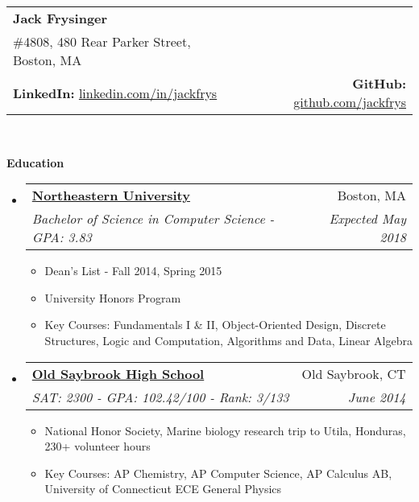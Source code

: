 \documentclass[letterpaper,10pt]{article}
\makeatletter
\newcommand{\resitem}[1]{\item #1 \vspace{-2pt}}
\newcommand{\resheading}[1]{{\large \colorbox{mygrey}{\begin{minipage}{\textwidth}{\textbf{#1 \vphantom{p\^{E}}}}\end{minipage}}}}
\newcommand{\ressubheading}[4]{
\begin{tabular*}{6.8in}{l@{\extracolsep{\fill}}r}
		\textbf{#1} & #2 \\
		\emph{#3} & \emph{#4} \\
\end{tabular*}\vspace{-6pt}}
\makeatother
\begin{document}
\newcommand{\mywebheader}{
\begin{tabular*}{7in}{l@{\extracolsep{\fill}}r}
	\textbf{\LARGE Jack Frysinger}
	\\
	\#4808, 480 Rear Parker Street, Boston, MA
	\\
	\textbf{LinkedIn:} \href{http://linkedin.com/in/jackfrys}{linkedin.com/in/jackfrys} & \textbf{GitHub:} \href{https://github.com/jackfrys}{github.com/jackfrys} \\
	\end{tabular*}
\\
\vspace{0.1in}}

\mywebheader

\resheading{Education}
	\begin{itemize}[leftmargin=*]
		\item[]
			\ressubheading{\href{http://www.northeastern.edu}{Northeastern University}}{Boston, MA}{{Bachelor of Science in Computer Science - }{GPA: 3.83}}{Expected May 2018}
				{ \footnotesize
				\begin{itemize}
					\resitem{Dean's List - Fall 2014, Spring 2015}
					\resitem{University Honors Program}
					\resitem{Key Courses: Fundamentals I \& II, Object-Oriented Design, Discrete Structures, Logic and Computation, Algorithms and Data, Linear Algebra}
				\end{itemize}}
		\item[]
			\ressubheading{\href{http://www.oldsaybrookschools.org/page.cfm?p=605}{Old Saybrook High School}}{Old Saybrook, CT}{{SAT: 2300 - }{GPA: 102.42/100 - Rank: 3/133}}{June 2014}
			{\footnotesize
			\begin{itemize}
				\resitem{National Honor Society, Marine biology research trip to Utila, Honduras, 230+ volunteer hours}
				\resitem{Key Courses: AP Chemistry, AP Computer Science, AP Calculus AB, University of Connecticut ECE General Physics}
			\end{itemize}}
	\end{itemize} %
\end{document}
